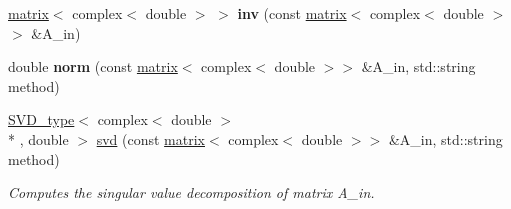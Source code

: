 \begin{DoxyCompactItemize}
\item 
\hypertarget{namespacekeycpp_ac9cabca49e9650ae8b5aadf5ee2f7f4e}{\hyperlink{classkeycpp_1_1matrix}{matrix}$<$ complex$<$ double $>$ $>$ {\bfseries inv} (const \hyperlink{classkeycpp_1_1matrix}{matrix}$<$ complex$<$ double $>$$>$ \&A\-\_\-in)}\label{namespacekeycpp_ac9cabca49e9650ae8b5aadf5ee2f7f4e}

\item 
\hypertarget{namespacekeycpp_a55e5e5bd17f11bc2585161c4229e6eaf}{double {\bfseries norm} (const \hyperlink{classkeycpp_1_1matrix}{matrix}$<$ complex$<$ double $>$$>$ \&A\-\_\-in, std\-::string method)}\label{namespacekeycpp_a55e5e5bd17f11bc2585161c4229e6eaf}

\item 
\hypertarget{namespacekeycpp_a72ae28f3433b8617a1252c7995fc21db}{\hyperlink{structkeycpp_1_1_s_v_d__type}{S\-V\-D\-\_\-type}$<$ complex$<$ double $>$\\*
, double $>$ \hyperlink{namespacekeycpp_a72ae28f3433b8617a1252c7995fc21db}{svd} (const \hyperlink{classkeycpp_1_1matrix}{matrix}$<$ complex$<$ double $>$$>$ \&A\-\_\-in, std\-::string method)}\label{namespacekeycpp_a72ae28f3433b8617a1252c7995fc21db}

\begin{DoxyCompactList}\small\item\em Computes the singular value decomposition of matrix A\-\_\-in. \end{DoxyCompactList}\end{DoxyCompactItemize}


